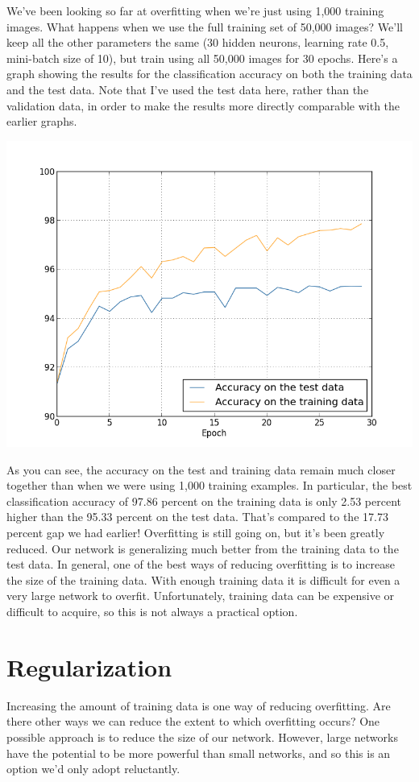 \documentclass[a4paper,twoside,10pt]{book}
\begin{document}
We've been looking so far at overfitting when we're just using 1,000 training images. What happens when we use the full training set of 50,000 images? We'll keep all the other parameters the same (30 hidden neurons, learning rate 0.5, mini-batch size of 10), but train using all 50,000 images for 30 epochs. Here's a graph showing the results for the classification accuracy on both the training data and the test data. Note that I've used the test data here, rather than the validation data, in order to make the results more directly comparable with the earlier graphs.
\begin{center}
	\includegraphics[width=0.7\linewidth]{figures/ch3/overfitting_full}
\end{center}
As you can see, the accuracy on the test and training data remain much closer together than when we were using 1,000 training examples. In particular, the best classification accuracy of 97.86 percent on the training data is only 2.53 percent higher than the 95.33 percent on the test data. That's compared to the 17.73 percent gap we had earlier! Overfitting is still going on, but it's been greatly reduced. Our network is generalizing much better from the training data to the test data. In general, one of the best ways of reducing overfitting is to increase the size of the training data. With enough training data it is difficult for even a very large network to overfit. Unfortunately, training data can be expensive or difficult to acquire, so this is not always a practical option.

\section{Regularization}
Increasing the amount of training data is one way of reducing overfitting. Are there other ways we can reduce the extent to which overfitting occurs? One possible approach is to reduce the size of our network. However, large networks have the potential to be more powerful than small networks, and so this is an option we'd only adopt reluctantly.
\end{document}
